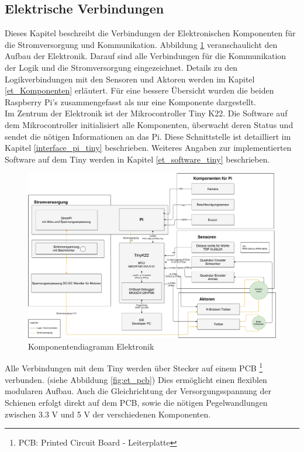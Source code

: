 \documentclass[../../main.tex]{subfiles}
\begin{document}
    \subsection{Elektrische Verbindungen} \label{et_verbindungen}
    Dieses Kapitel beschreibt die Verbindungen der Elektronischen Komponenten für die Stromversorgung und Kommunikation. Abbildung \ref{fig:et_komponenten} veranschaulicht den Aufbau der Elektronik. Darauf sind alle Verbindungen für die Kommunikation der Logik und die Stromversorgung eingezeichnet. Details zu den Logikverbindungen mit den Sensoren und Aktoren werden im Kapitel \ref{et_Komponenten} erläutert. Für eine bessere Übersicht wurden die beiden Raspberry Pi's zusammengefasst als nur eine Komponente dargestellt.\\
    Im Zentrum der Elektronik ist der Mikrocontroller Tiny K22. Die Software auf dem Mikrocontroller initialisiert alle Komponenten, überwacht deren Status und sendet die nötigen Informationen an das Pi. Diese Schnittstelle ist detailliert im Kapitel \ref{interface_pi_tiny} beschrieben. Weiteres Angaben zur implementierten Software auf dem Tiny werden in Kapitel \ref{et_software_tiny} beschrieben.\\

    \begin{figure}[H]
        \centering
        \includegraphics[width=1.0\textwidth]{../../images/et/KomponentenDiagramm_ET.pdf}
        \caption {Komponentendiagramm Elektronik}
        \label{fig:et_komponenten}
    \end{figure}

    Alle Verbindungen mit dem Tiny werden über Stecker auf einem PCB \footnote{PCB: Printed Circuit Board - Leiterplatte} verbunden. (siehe Abbildung \ref{fig:et_pcb}) Dies ermöglicht einen flexiblen modularen Aufbau. Auch die Gleichrichtung der Versorgungsspannung der Schienen erfolgt direkt auf dem PCB, sowie die nötigen Pegelwandlungen zwischen 3.3 V und 5 V der verschiedenen Komponenten.\\
\end{document}
